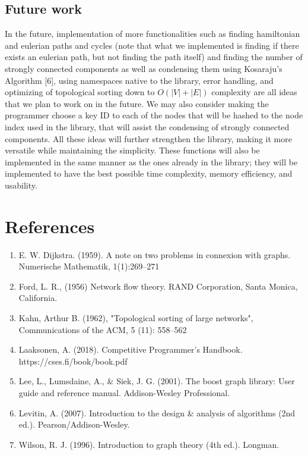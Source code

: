 \documentclass[a4paper,12pt]{article}
\begin{document}
\subsection{Future work}
In the future, implementation of more functionalities such as finding hamiltonian and eulerian paths and cycles (note that what we implemented is finding if there exists an eulerian path, but not finding the path itself) and finding the number of strongly connected components as well as condensing them using Kosaraju's Algorithm [6], using namespaces native to the library, error handling, and optimizing of topological sorting down to $O\left(|V|+|E|\right)$ complexity are all ideas that we plan to work on in the future. We may also consider making the programmer choose a key ID to each of the nodes that will be hashed to the node index used in the library, that will assist the condensing of strongly connected components. All these ideas will further strengthen the library, making it more versatile while maintaining the simplicity. These functions will also be implemented in the same manner as the ones already in the library; they will be implemented to have the best possible time complexity, memory efficiency, and usability.


\section{References}
\begin{enumerate}
    \item E. W. Dijkstra. (1959). A note on two problems in connexion with graphs. Numerische Mathematik, 1(1):269–271
    \item Ford, L. R., (1956) Network flow theory. RAND Corporation, Santa Monica, California.

    \item Kahn, Arthur B. (1962), "Topological sorting of large networks", Communications of the ACM, 5 (11): 558–562

    \item Laaksonen, A. (2018). Competitive Programmer’s Handbook. https://cses.fi/book/book.pdf

    \item Lee, L., Lumsdaine, A., & Siek, J. G. (2001). The boost graph library: User guide and reference manual. Addison-Wesley Professional.
    
    \item  Levitin, A. (2007). Introduction to the design \& analysis of algorithms (2nd ed.). Pearson/Addison-Wesley.

    \item Wilson, R. J. (1996). Introduction to graph theory (4th ed.). Longman.

    

\end{enumerate}
\end{document}
